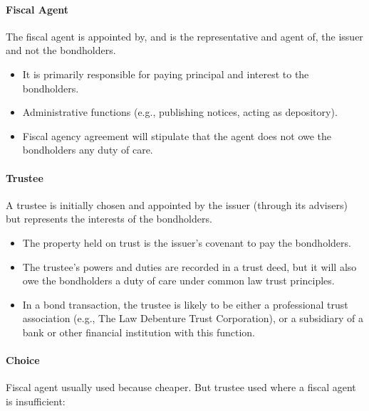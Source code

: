 \documentclass[
]{article}
\providecommand{\tightlist}{%
  \setlength{\itemsep}{0pt}\setlength{\parskip}{0pt}}
\begin{document}
\hypertarget{fiscal-agent}{%
\paragraph{Fiscal Agent}\label{fiscal-agent}}

The fiscal agent is appointed by, and is the representative and agent
of, the issuer and not the bondholders.

\begin{itemize}
\tightlist
\item
  It is primarily responsible for paying principal and interest to the
  bondholders.
\item
  Administrative functions (e.g., publishing notices, acting as
  depository).
\item
  Fiscal agency agreement will stipulate that the agent does not owe the
  bondholders any duty of care.
\end{itemize}

\hypertarget{trustee}{%
\paragraph{Trustee}\label{trustee}}

A trustee is initially chosen and appointed by the issuer (through its
advisers) but represents the interests of the bondholders.

\begin{itemize}
\tightlist
\item
  The property held on trust is the issuer's covenant to pay the
  bondholders.
\item
  The trustee's powers and duties are recorded in a trust deed, but it
  will also owe the bondholders a duty of care under common law trust
  principles.
\item
  In a bond transaction, the trustee is likely to be either a
  professional trust association (e.g., The Law Debenture Trust
  Corporation), or a subsidiary of a bank or other financial institution
  with this function.
\end{itemize}

\hypertarget{choice}{%
\paragraph{Choice}\label{choice}}

Fiscal agent usually used because cheaper. But trustee used where a
fiscal agent is insufficient:
\end{document}
